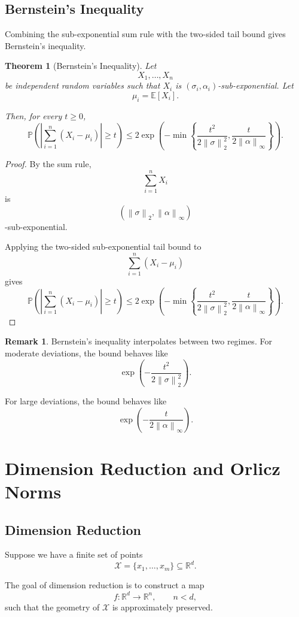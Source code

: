 \documentclass[12pt,oneside]{book}
\numberwithin{equation}{section}
\theoremstyle{definition}
\newtheorem{remark}{Remark}[section]
\theoremstyle{plain}
\newtheorem{theorem}{Theorem}[section]
\theoremstyle{remark}
\newcommand{\R}{\mathbb{R}}
\newcommand{\E}{\mathbb{E}}
\newcommand{\Prob}{\mathbb{P}}
\newcommand{\norm}[1]{\left\lVert #1 \right\rVert}
\begin{document}
\section{Bernstein's Inequality}

Combining the sub-exponential sum rule with the two-sided tail bound gives Bernstein's inequality.

\begin{theorem}[Bernstein's Inequality]
Let
\[
X_1,\dots,X_n
\]
be independent random variables such that $X_i$ is $(\sigma_i,\alpha_i)$-sub-exponential. Let
\[
\mu_i=\E[X_i].
\]

Then, for every $t\geq0$,
\[
\Prob\left(
\left|
\sum_{i=1}^n (X_i-\mu_i)
\right|
\geq t
\right)
\leq
2\exp\left(
-\min\left\{
\frac{t^2}{2\norm{\sigma}_2^2},
\frac{t}{2\norm{\alpha}_\infty}
\right\}
\right).
\]
\end{theorem}

\begin{proof}
By the sum rule,
\[
\sum_{i=1}^n X_i
\]
is
\[
\left(
\norm{\sigma}_2,
\norm{\alpha}_\infty
\right)
\]
-sub-exponential.

Applying the two-sided sub-exponential tail bound to
\[
\sum_{i=1}^n (X_i-\mu_i)
\]
gives
\[
\Prob\left(
\left|
\sum_{i=1}^n (X_i-\mu_i)
\right|
\geq t
\right)
\leq
2\exp\left(
-\min\left\{
\frac{t^2}{2\norm{\sigma}_2^2},
\frac{t}{2\norm{\alpha}_\infty}
\right\}
\right).
\]
\end{proof}

\begin{remark}
Bernstein's inequality interpolates between two regimes. For moderate deviations, the bound behaves like
\[
\exp\left(
-\frac{t^2}{2\norm{\sigma}_2^2}
\right).
\]

For large deviations, the bound behaves like
\[
\exp\left(
-\frac{t}{2\norm{\alpha}_\infty}
\right).
\]
\end{remark}

\chapter{Dimension Reduction and Orlicz Norms}

\section{Dimension Reduction}

Suppose we have a finite set of points
\[
\mathcal{X}=\{x_1,\dots,x_m\}\subseteq \R^d.
\]

The goal of dimension reduction is to construct a map
\[
f:\R^d\to\R^n,
\qquad n<d,
\]
such that the geometry of $\mathcal{X}$ is approximately preserved.
\end{document}
